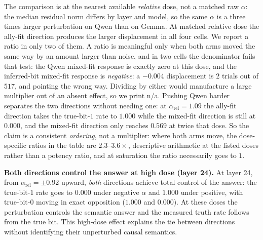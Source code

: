 \documentclass{article}
\begin{document}
The comparison is at the nearest available \emph{relative} dose, not a matched raw $\alpha$: the median
residual norm differs by layer and model, so the same $\alpha$ is a three times larger perturbation on Qwen
than on Gemma. At matched relative dose the ally-fit direction produces the larger displacement in
all four cells. We report a ratio in only two of them. A ratio is meaningful only when both arms moved the same way by an amount larger than noise,
and in two cells the denominator fails that test: the Qwen mixed-fit response is exactly zero at this dose,
and the inferred-bit mixed-fit response is \emph{negative}: a $-0.004$ displacement is $2$ trials out of $517$, and pointing the wrong way. Dividing by either would manufacture a large multiplier out of an absent
effect, so we print n/a. Pushing Qwen harder separates the two directions without needing one: at
$\alpha_{\mathrm{rel}} = 1.09$ the ally-fit direction takes the true-bit-$1$ rate to $1.000$ while the
mixed-fit direction is still at $0.000$, and the mixed-fit direction only reaches $0.569$ at twice that dose.
So the claim is a consistent \emph{ordering}, not a multiplier: where both arms move, the dose-specific ratios in the table are
$2.3$--$3.6\times$, descriptive arithmetic at the listed doses rather than a potency ratio, and at saturation the ratio necessarily goes to $1$.

\textbf{Both directions control the answer at high dose (layer 24).} At layer 24, from
$\alpha_{\mathrm{rel}} = \pm0.92$ upward, \emph{both} directions achieve total control of the answer: the
true-bit-$1$ rate goes to $0.000$ under negative $\alpha$ and $1.000$ under positive, with true-bit-$0$
moving in exact opposition ($1.000$ and $0.000$). At these doses the perturbation controls the semantic answer and the measured truth rate follows from the true bit. This high-dose effect explains the tie between directions without identifying their unperturbed causal semantics.
\end{document}

